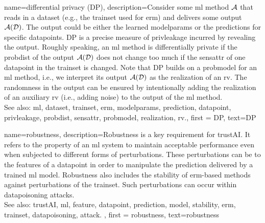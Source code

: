 {name={differential privacy (DP)},
  description={Consider some \gls{ml} method $\mathcal{A}$ 
  	that reads in a \gls{dataset} (e.g., the \gls{trainset} 
  	used for \gls{erm}) and delivers some output $\mathcal{A}(\mathcal{D})$. The output 
  	could be either the learned \gls{modelparams} or the \glspl{prediction} for specific \glspl{datapoint}. 
  	DP is a precise measure of \gls{privleakage} incurred by revealing the 
  	output. Roughly speaking, an \gls{ml} method is differentially private if the \gls{probdist} 
  	of the output $\mathcal{A}(\mathcal{D})$ does not change too much if the \gls{sensattr} 
  	of one \gls{datapoint} in the \gls{trainset} is changed. Note that DP 
  	builds on a \gls{probmodel} for an \gls{ml} method, i.e., we interpret its output $\mathcal{A}(\mathcal{D})$ 
  	as the \gls{realization} of an \gls{rv}. The randomness in the output can be ensured 
  	by intentionally adding the \gls{realization} of an auxiliary \gls{rv} (i.e., adding noise) to 
  	the output of the \gls{ml} method.
				\\ 
		See also: \gls{ml}, \gls{dataset}, \gls{trainset}, \gls{erm}, \gls{modelparams}, \gls{prediction}, \gls{datapoint}, \gls{privleakage}, \gls{probdist}, \gls{sensattr}, \gls{probmodel}, \gls{realization}, \gls{rv}.}, 
	first = {DP}, 
	text={DP} 
}

{name={robustness},
	description={Robustness is a key requirement for \gls{trustAI}. It
		refers to the property of an \gls{ml} system to maintain acceptable performance even when 
		subjected to different forms of perturbations. These perturbations can be to the \glspl{feature} 
		of a \gls{datapoint} in order to manipulate the \gls{prediction} delivered by a trained \gls{ml} \gls{model}. 
		Robustness also includes the \gls{stability} of \gls{erm}-based methods against perturbations 
		of the \gls{trainset}. Such perturbations can occur within \gls{datapoisoning} \glspl{attack}. 
		\\ See also: \gls{trustAI}, \gls{ml}, \gls{feature}, \gls{datapoint}, \gls{prediction}, \gls{model}, \gls{stability}, \gls{erm}, \gls{trainset}, \gls{datapoisoning}, \gls{attack}.
	}, 
	first = {robustness}, 
	text={robustness} 
}


